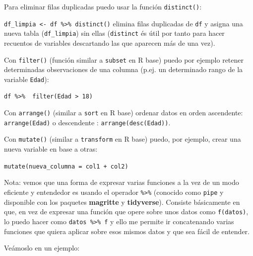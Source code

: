 \documentclass[]{book}
\newenvironment{Shaded}{\begin{snugshade}}{\end{snugshade}}
\newcommand{\CommentTok}[1]{\textcolor[rgb]{0.56,0.35,0.01}{\textit{#1}}}
\newcommand{\DataTypeTok}[1]{\textcolor[rgb]{0.13,0.29,0.53}{#1}}
\newcommand{\DecValTok}[1]{\textcolor[rgb]{0.00,0.00,0.81}{#1}}
\newcommand{\KeywordTok}[1]{\textcolor[rgb]{0.13,0.29,0.53}{\textbf{#1}}}
\newcommand{\NormalTok}[1]{#1}
\newcommand{\OperatorTok}[1]{\textcolor[rgb]{0.81,0.36,0.00}{\textbf{#1}}}
\newcommand{\StringTok}[1]{\textcolor[rgb]{0.31,0.60,0.02}{#1}}
\theoremstyle{definition}
\theoremstyle{definition}
\theoremstyle{definition}
\theoremstyle{remark}
\begin{document}
Para eliminar filas duplicadas puedo usar la función
\texttt{distinct()}:

\texttt{df\_limpia\ \textless{}-\ df\ \%\textgreater{}\%\ distinct()}
elimina filas duplicadas de \texttt{df} y asigna una nueva tabla
(\texttt{df\_limpia}) sin ellas (\texttt{distinct} és útil por tanto
para hacer recuentos de variables descartando las que aparecen más de
una vez).

Con \texttt{filter()} (función similar a \texttt{subset} en R base)
puedo por ejemplo retener determinadas observaciones de una columna
(p.ej. un determinado rango de la variable \texttt{Edad}):

\texttt{df\ \%\textgreater{}\%\ \ filter(Edad\ \textgreater{}\ 18)}

Con \texttt{arrange()} (similar a \texttt{sort} en R base) ordenar datos
en orden ascendente: \texttt{arrange(Edad)} o descendente :
\texttt{arrange(desc(Edad))}.

Con \texttt{mutate()} (similar a \texttt{transform} en R base) puedo,
por ejemplo, crear una nueva variable en base a otras:

\texttt{mutate(nueva\_columna\ =\ col1\ +\ col2)}

Nota: vemos que una forma de expresar varias funciones a la vez de un
modo eficiente y entendedor es usando el operador
\texttt{\%\textgreater{}\%} (conocido como \texttt{pipe} y disponible
con los paquetes \textbf{magritte} y \textbf{tidyverse}). Consiste
básicamente en que, en vez de expresar una función que opere sobre unos
datos como \texttt{f(datos)}, lo puedo hacer como
\texttt{datos\ \%\textgreater{}\%\ f} y ello me permite ir concatenando
varias funciones que quiera aplicar sobre esos mismos datos y que sea
fácil de entender.

Veámoslo en un ejemplo:

\begin{Shaded}
\end{Shaded}
\end{document}
